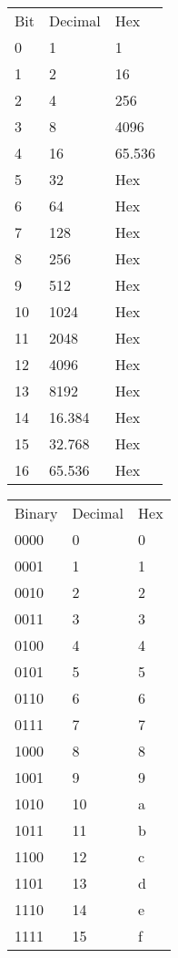 \documentclass[12pt,landscape,a4paper]{article}
\begin{document}
\raggedright
\footnotesize
\begin{multicols}{4}

\begin{minipage}[t]{\linewidth}
\begin{tabular}{l | l | l}
    Bit & Decimal & Hex \\
    0 & 1 & 1 \\
    1 & 2 & 16 \\
    2 & 4 & 256 \\
    3 & 8 & 4096 \\
    4 & 16 & 65.536 \\
    5 & 32 & Hex \\
    6 & 64 & Hex \\
    7 & 128 & Hex \\
    8 & 256 & Hex \\
    9 & 512 & Hex \\
    10 & 1024 & Hex \\
    11 & 2048 & Hex \\
    12 & 4096 & Hex \\
    13 & 8192 & Hex \\
    14 & 16.384 & Hex \\
    15 & 32.768 & Hex \\
    16 & 65.536 & Hex \\
\end{tabular}

\begin{tabular}{l | l | l}
    Binary & Decimal & Hex \\
    0000 & 0 & 0 \\
    0001 & 1 & 1 \\
    0010 & 2 & 2 \\
    0011 & 3 & 3 \\
    0100 & 4 & 4 \\
    0101 & 5 & 5 \\
    0110 & 6 & 6 \\
    0111 & 7 & 7 \\
    1000 & 8 & 8 \\
    1001 & 9 & 9 \\
    1010 & 10 & a \\
    1011 & 11 & b \\
    1100 & 12 & c \\
    1101 & 13 & d \\
    1110 & 14 & e \\
    1111 & 15 & f \\
\end{tabular}


\end{minipage}
\end{multicols}
\end{document}

